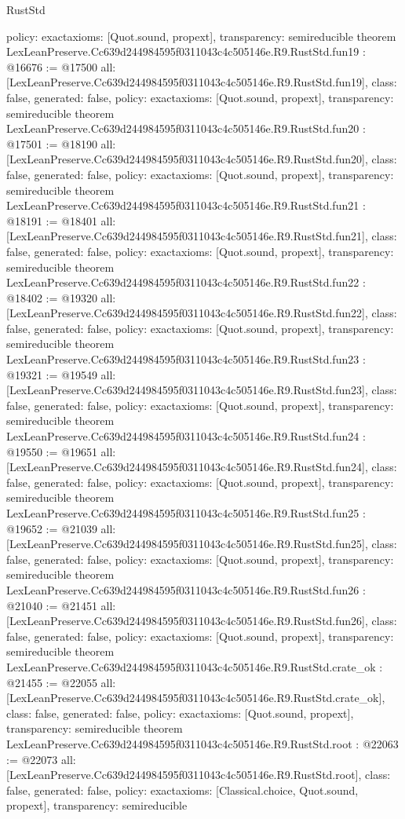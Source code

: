 \begin{lexlean}{RustStd}
\begin{coremodule}
{  policy: exact{axioms: [Quot.sound, propext]},
  transparency: semireducible
}
theorem LexLeanPreserve.Cc639d244984595f0311043c4c505146e.R9.RustStd.fun19 : @16676 := @17500 {
  all: [LexLeanPreserve.Cc639d244984595f0311043c4c505146e.R9.RustStd.fun19],
  class: false,
  generated: false,
  policy: exact{axioms: [Quot.sound, propext]},
  transparency: semireducible
}
theorem LexLeanPreserve.Cc639d244984595f0311043c4c505146e.R9.RustStd.fun20 : @17501 := @18190 {
  all: [LexLeanPreserve.Cc639d244984595f0311043c4c505146e.R9.RustStd.fun20],
  class: false,
  generated: false,
  policy: exact{axioms: [Quot.sound, propext]},
  transparency: semireducible
}
theorem LexLeanPreserve.Cc639d244984595f0311043c4c505146e.R9.RustStd.fun21 : @18191 := @18401 {
  all: [LexLeanPreserve.Cc639d244984595f0311043c4c505146e.R9.RustStd.fun21],
  class: false,
  generated: false,
  policy: exact{axioms: [Quot.sound, propext]},
  transparency: semireducible
}
theorem LexLeanPreserve.Cc639d244984595f0311043c4c505146e.R9.RustStd.fun22 : @18402 := @19320 {
  all: [LexLeanPreserve.Cc639d244984595f0311043c4c505146e.R9.RustStd.fun22],
  class: false,
  generated: false,
  policy: exact{axioms: [Quot.sound, propext]},
  transparency: semireducible
}
theorem LexLeanPreserve.Cc639d244984595f0311043c4c505146e.R9.RustStd.fun23 : @19321 := @19549 {
  all: [LexLeanPreserve.Cc639d244984595f0311043c4c505146e.R9.RustStd.fun23],
  class: false,
  generated: false,
  policy: exact{axioms: [Quot.sound, propext]},
  transparency: semireducible
}
theorem LexLeanPreserve.Cc639d244984595f0311043c4c505146e.R9.RustStd.fun24 : @19550 := @19651 {
  all: [LexLeanPreserve.Cc639d244984595f0311043c4c505146e.R9.RustStd.fun24],
  class: false,
  generated: false,
  policy: exact{axioms: [Quot.sound, propext]},
  transparency: semireducible
}
theorem LexLeanPreserve.Cc639d244984595f0311043c4c505146e.R9.RustStd.fun25 : @19652 := @21039 {
  all: [LexLeanPreserve.Cc639d244984595f0311043c4c505146e.R9.RustStd.fun25],
  class: false,
  generated: false,
  policy: exact{axioms: [Quot.sound, propext]},
  transparency: semireducible
}
theorem LexLeanPreserve.Cc639d244984595f0311043c4c505146e.R9.RustStd.fun26 : @21040 := @21451 {
  all: [LexLeanPreserve.Cc639d244984595f0311043c4c505146e.R9.RustStd.fun26],
  class: false,
  generated: false,
  policy: exact{axioms: [Quot.sound, propext]},
  transparency: semireducible
}
theorem LexLeanPreserve.Cc639d244984595f0311043c4c505146e.R9.RustStd.crate_ok : @21455 := @22055 {
  all: [LexLeanPreserve.Cc639d244984595f0311043c4c505146e.R9.RustStd.crate_ok],
  class: false,
  generated: false,
  policy: exact{axioms: [Quot.sound, propext]},
  transparency: semireducible
}
theorem LexLeanPreserve.Cc639d244984595f0311043c4c505146e.R9.RustStd.root : @22063 := @22073 {
  all: [LexLeanPreserve.Cc639d244984595f0311043c4c505146e.R9.RustStd.root],
  class: false,
  generated: false,
  policy: exact{axioms: [Classical.choice, Quot.sound, propext]},
  transparency: semireducible
}


\end{coremodule}
\end{lexlean}

